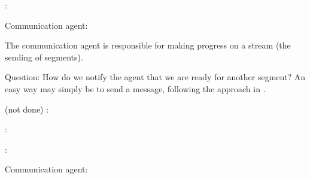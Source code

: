 \begin{mmadi}
\begin{shmem}
:

Communication agent:

The communication agent is responsible for making progress on a stream (the
sending of segments).  

Question: How do we notify the agent that we are ready for another segment?
An easy way may simply be to send a message, following the approach in
\tcpname. 
\end{shmem}

\begin{via}
(not done)
:

:

:

Communication agent:

\end{via}
\end{mmadi}
